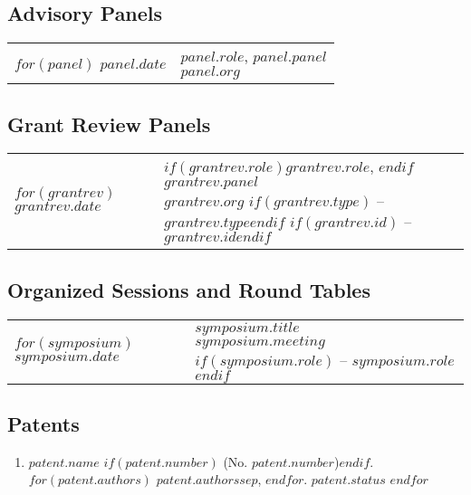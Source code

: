 \documentclass[martgin, line]{article}
\begin{document}
\subsection*{Advisory Panels}
\setlength{\extrarowheight}{.75em}
\begin{tabular}{lp{5.5in}}   
$for(panel)$
$panel.date$&
\parbox[t]{5.5in}{$panel.role$, $panel.panel$\\
  \textit{$panel.org$}}\\
$endfor$
\end{tabular}
\setlength{\extrarowheight}{0em}

\subsection*{Grant Review Panels}
\setlength{\extrarowheight}{.75em}
\begin{tabular}{lp{5.5in}}   
$for(grantrev)$
$grantrev.date$&
\parbox[t]{5.5in}{
  $if(grantrev.role)$$grantrev.role$, $endif$ 
  $grantrev.panel$\\
  \textit{$grantrev.org$}
  $if(grantrev.type)$ -- \textit{$grantrev.type$}$endif$
  $if(grantrev.id)$ -- \textit{$grantrev.id$}$endif$
  }\\
$endfor$
\end{tabular}
\setlength{\extrarowheight}{0em}

\subsection*{Organized Sessions and Round Tables}
\setlength{\extrarowheight}{.75em}
\begin{tabular}{lp{5.5in}}   
$for(symposium)$
$symposium.date$&
\parbox[t]{5.5in}{
    $symposium.title$\\
  \textit{$symposium.meeting$}
  $if(symposium.role)$ -- $symposium.role$$endif$ 
  }\\
$endfor$
\end{tabular}
\setlength{\extrarowheight}{0em}



\subsection*{Patents}
\begin{enumerate}
  $for(patent)$
  \item
  $patent.name$
  $if(patent.number)$ (No. $patent.number$)$endif$.
  $for(patent.authors)$
  $patent.authors$$sep$,
  $endfor$.
  \textit{$patent.status$}
  $endfor$
\end{enumerate}
\end{document}
